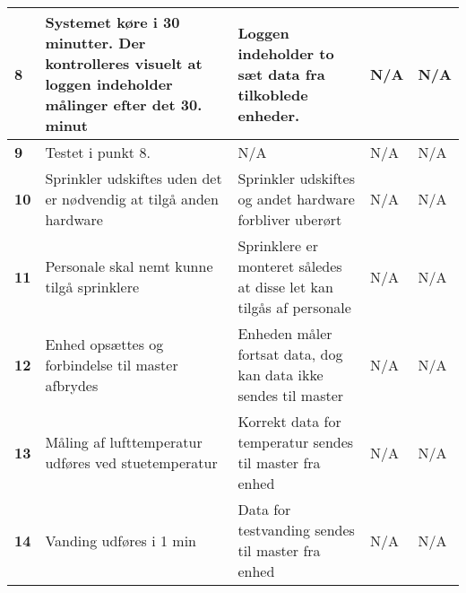 \begin{center}
\begin{longtable}{|p{}|p{}|p{}|p{}|p{}|}
\textbf{8}	&Systemet køre i 30 minutter. Der kontrolleres visuelt at loggen indeholder målinger efter det 30. minut
			&Loggen indeholder to sæt data fra tilkoblede enheder.
			&N/A
			&N/A \\ \hline 
\textbf{9}	&Testet i punkt 8.
			&N/A
			&N/A
			&N/A \\ \hline 
						
\textbf{10}	&Sprinkler udskiftes uden det er nødvendig at tilgå anden hardware
			&Sprinkler udskiftes og andet hardware forbliver uberørt
			&N/A
			&N/A \\ \hline 
			
\textbf{11}	&Personale skal nemt kunne tilgå sprinklere
			&Sprinklere er monteret således at disse let kan tilgås af personale
			&N/A
			&N/A \\ \hline 
			
			
\textbf{12}	&Enhed opsættes og forbindelse til master afbrydes
			&Enheden måler fortsat data, dog kan data ikke sendes til master
			&N/A
			&N/A \\ \hline 
			
\textbf{13}	&Måling af lufttemperatur udføres ved stuetemperatur
			&Korrekt data for temperatur sendes til master fra enhed
			&N/A
			&N/A \\ \hline 
			
\textbf{14}	&Vanding udføres i 1 min 
			&Data for testvanding sendes til master fra enhed
			&N/A
			&N/A \\ \hline 
			
%			
%			
%
\end{longtable}
	\label{ATIFKrav} 
\end{center}


